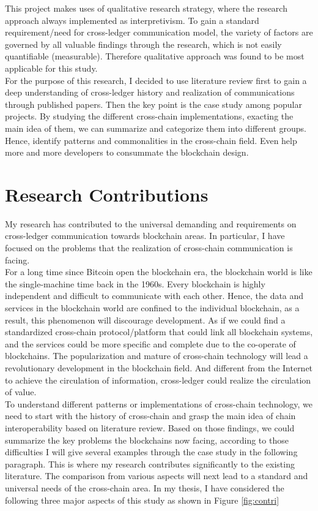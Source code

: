 \noindent This project makes uses of qualitative research strategy, where the research approach always implemented as interpretivism. To gain a standard requirement/need for cross-ledger communication model, the variety of factors are governed by all valuable findings through the research, which is not easily quantifiable (measurable). Therefore qualitative approach was found to be most applicable for this study.\\

\noindent For the purpose of this research, I decided to use literature review first to gain a deep understanding of cross-ledger history and realization of communications through published papers. Then the key point is the case study among popular projects. By studying the different cross-chain implementations, exacting the main idea of them, we can summarize and categorize them into different groups. Hence, identify patterns and commonalities in the cross-chain field. Even help more and more developers to consummate the blockchain design.


\section{Research Contributions}

\noindent My research has contributed to the universal demanding and requirements on cross-ledger communication towards blockchain areas. In particular, I have focused on the problems that the realization of cross-chain communication is facing.\\

\noindent For a long time since Bitcoin open the blockchain era, the blockchain world is like the single-machine time back in the 1960s. Every blockchain is highly independent and difficult to communicate with each other. Hence, the data and services in the blockchain world are confined to the individual blockchain, as a result, this phenomenon will discourage development. As if we could find a standardized cross-chain protocol/platform that could link all blockchain systems, and the services could be more specific and complete due to the co-operate of blockchains. The popularization and mature of cross-chain technology will lead a revolutionary development in the blockchain field. And different from the Internet to achieve the circulation of information, cross-ledger could realize the circulation of value.\\

\noindent To understand different patterns or implementations of cross-chain technology, we need to start with the history of cross-chain and grasp the main idea of chain interoperability based on literature review. Based on those findings, we could summarize the key problems the blockchains now facing, according to those difficulties I will give several examples through the case study in the following paragraph. This is where my research contributes significantly to the existing literature. The comparison from various aspects will next lead to a standard and universal needs of the cross-chain area. In my thesis, I have considered the following three major aspects of this study as shown in Figure \ref{fig:contri}

